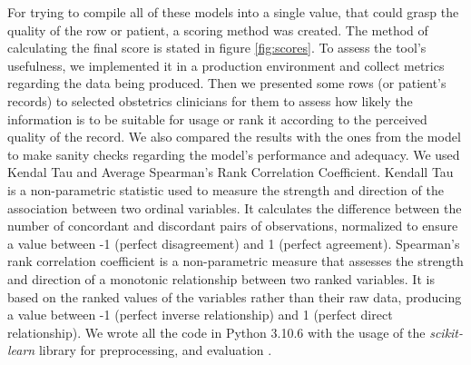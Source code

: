 For trying to compile all of these models into a single value, that could grasp the quality of the row or patient, a scoring method was created. The method of calculating the final score is stated in figure \ref{fig:scores}. To assess the tool’s usefulness, we implemented it in a production environment and collect metrics regarding the data being produced. Then we presented some rows (or patient's records) to selected obstetrics clinicians for them to assess how likely the information is to be suitable for usage or rank it according to the perceived quality of the record. We also compared the results with the ones from the model to make sanity checks regarding the model’s performance and adequacy. We used Kendal Tau and Average Spearman’s Rank Correlation Coefficient. Kendall Tau is a non-parametric statistic used to measure the strength and direction of the association between two ordinal variables. It calculates the difference between the number of concordant and discordant pairs of observations, normalized to ensure a value between -1 (perfect disagreement) and 1 (perfect agreement). Spearman’s rank correlation coefficient is a non-parametric measure that assesses the strength and direction of a monotonic relationship between two ranked variables. It is based on the ranked values of the variables rather than their raw data, producing a value between -1 (perfect inverse relationship) and 1 (perfect direct relationship).
We wrote all the code in Python 3.10.6 with the usage of the \textit{scikit-learn} library for preprocessing, and evaluation \cite{scikit-learn}.



